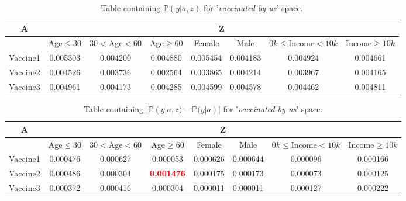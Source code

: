 \documentclass{article}
\begin{document}
\begin{center}
    \begin{table}[H]
    \begin{adjustbox}{max width=\textwidth}
        \begin{tabular}{ |c| c c c c c c c|}
            \hline
              A  & \multicolumn{7}{c|}{Z} \\
              \hline
              & Age$\leq30$ &    $30<$Age$<60$ &     Age$\geq60$ &    Female &      Male &   $0k\leq$Income$<10k$ &    Income$\geq10k$ \\
            \hline
            Vaccine1 &  0.005303 &  0.004200 &  0.004880 &  0.005454 &  0.004183 &  0.004924 &  0.004661 \\
            Vaccine2 &  0.004526 &  0.003736 &  0.002564 &  0.003865 &  0.004214 &  0.003967 &  0.004165 \\
            Vaccine3 &  0.004961 &  0.004173 &  0.004285 &  0.004599 &  0.004578 &  0.004462 &  0.004811
             \\ \hline
        \end{tabular}
        \end{adjustbox}
        \caption{Table containing $\mathbb{P}(y | a, z)$ for '\textit{vaccinated by us}' space.}
        \label{tab:8}
    \end{table}
\end{center}

\begin{center}
\begin{table}[H]
\begin{adjustbox}{max width=\textwidth}
    \begin{tabular}{ |c| c c c c c c c|}
        \hline
          A  & \multicolumn{7}{c|}{Z} \\
          \hline
          & Age$\leq30$ &    $30<$Age$<60$ &     Age$\geq60$ &    Female &      Male &   $0k\leq$Income$<10k$ &    Income$\geq10k$  \\
        \hline
        Vaccine1 &  0.000476 &  0.000627 &  0.000053 &  0.000626 &  0.000644 &  0.000096 &  0.000166 \\
        Vaccine2 &  0.000486 &  0.000304 &  \textbf{\textcolor{red}{0.001476}} &  0.000175 &  0.000173 &  0.000073 &  0.000125 \\
        Vaccine3 &  0.000372 &  0.000416 &  0.000304 &  0.000011 &  0.000011 &  0.000127 &  0.000222
         \\ \hline
    \end{tabular}
    \end{adjustbox}
    \caption{Table containing $| \mathbb{P}(y | a, z) - \mathbb{P}(y | a) |$ for '\textit{vaccinated by us}' space.}
    \label{tab:diff1}
\end{table}
\end{center}
\end{document}
